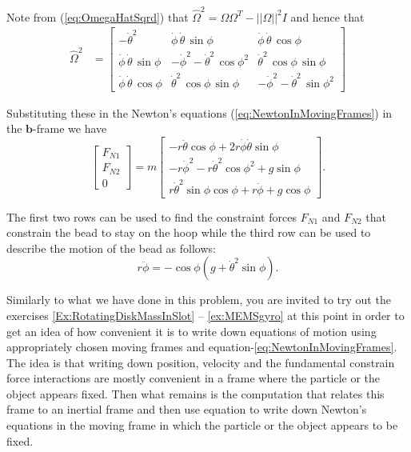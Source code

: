 \documentclass[graybox,envcountchap,sectrefs]{svmonoMuga}
\begin{document}
Note from (\ref{eq:OmegaHatSqrd}) that
$\widehat{\Omega}^2=\Omega\Omega^T-||\Omega||^2I$ and hence that
\begin{align*}
\widehat{\Omega}^2 &=
\left[\begin{array}{ccc}  - {\dot{\theta}}^2 & \dot{\phi}\, \dot{\theta}\, \sin\phi & \dot{\phi}\, \dot{\theta}\, \cos\phi\\ \dot{\phi}\, \dot{\theta}\, \sin\phi &  - {\dot{\phi}}^2 - {\dot{\theta}}^2\, {\cos\phi}^2 & {\dot{\theta}}^2\, \cos\phi\, \sin\phi\\ \dot{\phi}\, \dot{\theta}\, \cos\phi & {\dot{\theta}}^2\, \cos\phi\, \sin\phi &  - {\dot{\phi}}^2 - {\dot{\theta}}^2\, {\sin\phi}^2 \end{array}\right]
\end{align*}

Substituting these in the Newton's equations (\ref{eq:NewtonInMovingFrames}) in the $\mathbf{b}$-frame we have
\begin{equation*}
\begin{bmatrix}
F_{N1}\\ F_{N2}\\ 0
\end{bmatrix}
=m\begin{bmatrix}
  -r\ddot{\theta}\cos{\phi} + 2r\dot{\phi}\dot{\theta}\sin{\phi}\\
 -r\dot{\phi}^2 - r\dot{\theta}^2\cos{\phi}^2 + g\sin{\phi} \\
    r\dot{\theta}^2\sin\phi\cos\phi + r\ddot{\phi} + g\cos{\phi}
\end{bmatrix}.
\end{equation*}

The first two rows can be used to find the constraint forces $F_{N1}$ and $F_{N2}$ that constrain the bead to stay on the hoop while the third row can be used to describe the motion of the bead as follows:
\begin{equation*}
r\ddot{\phi}=-\cos{\phi}\left(g+\dot{\theta}^2\sin\phi\right).
\end{equation*}



Similarly to what we have done in this problem, you are invited to try out the exercises \ref{Ex:RotatingDiskMassInSlot} -- \ref{ex:MEMSgyro} at this point in order to get
an idea of how convenient it is to write down equations of motion using appropriately chosen moving frames and equation-\ref{eq:NewtonInMovingFrames}. The idea is that writing down position, velocity and the fundamental constrain force interactions are mostly convenient in a frame where the particle or the object appears fixed. Then what remains is the computation that relates this frame to an inertial frame and then use equation to write down Newton's equations in the moving frame in which the particle or the object appears to be fixed.
\end{document}
